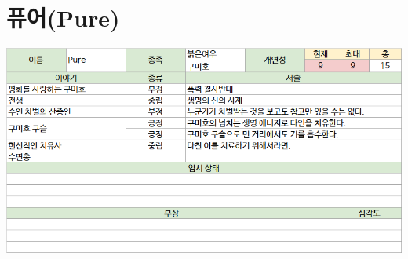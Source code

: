 \documentclass{report}
\begin{document}
	\section*{퓨어(Pure)}
		\includegraphics[width=\textwidth]{./Chapters/Lite/sheets/pure.png}
	
\end{document}
